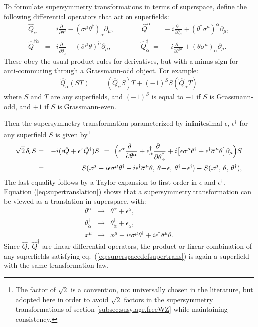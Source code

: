 \documentclass[12pt]{article}
\def\beq{\begin{eqnarray}}
\def\eeq{\end{eqnarray}}
\def\sigmabar{\overline\sigma}
\begin{document}
To formulate supersymmetry transformations in terms of superspace,
define the following differential operators that act on superfields:
\beq
\hat Q_\alpha &=& i \frac{\partial\phantom{x}}{\partial\theta^\alpha} 
- (\sigma^\mu \theta^\dagger)_\alpha \partial_\mu
,
\qquad\qquad
\hat Q^\alpha \>=\> -i\frac{\partial\phantom{x}}{\partial\theta_\alpha} 
+ (\theta^\dagger \sigmabar^\mu)^\alpha \partial_\mu
,
\label{eq:defQhat}
\\
\hat Q^{\dagger\dot\alpha} &=& 
i\frac{\partial\phantom{x}}{\partial\theta^\dagger_{\dot\alpha}} 
- (\sigmabar^\mu \theta)^{\dot\alpha} \partial_\mu
,
\qquad\qquad\>
\hat Q^{\dagger}_{\dot\alpha} \>=\> 
-i\frac{\partial\phantom{x}}{\partial\theta^{\dagger\dot\alpha}} 
+(\theta \sigma^\mu)_{\dot\alpha} \partial_\mu
.
\label{eq:defQdaggerhat}
\eeq
These obey the usual 
product rules for derivatives, but with a minus sign for anti-commuting through
a Grassmann-odd object. For example:
\beq
\hat Q_\alpha (S T) &=& (\hat Q_\alpha S) T + (-1)^S S (\hat Q_\alpha T)
\label{eq:grassmanproductrule}
\eeq
where $S$ and $T$ are any superfields, and $(-1)^S$ is equal to 
$-1$ if $S$ is Grassmann-odd, and $+1$ if $S$ is Grassmann-even.

Then the supersymmetry transformation parameterized by infinitesimal 
$\epsilon$, $\epsilon^\dagger$ for any superfield $S$ is given 
by\footnote{The factor of $\sqrt{2}$ is a convention, not universally 
chosen in the literature, but adopted here in order to avoid $\sqrt{2}$ 
factors in the supersymmetry transformations of section 
\ref{subsec:susylagr.freeWZ} while maintaining consistency.}
\beq
\sqrt{2}\, \delta_{\epsilon} S &=& 
-i
(\epsilon \hat Q + \epsilon^\dagger \hat Q^\dagger) S
\>\,=\>\,
\Bigl (\epsilon^\alpha \frac{\partial\phantom{x}}{\partial\theta^\alpha} 
    + \epsilon^\dagger_{\dot\alpha} 
\frac{\partial\phantom{x}}{\partial\theta^\dagger_{\dot\alpha}}
    + i \bigl [\epsilon \sigma^\mu \theta^\dagger 
       + \epsilon^\dagger \sigmabar^\mu \theta \bigr ] \partial_\mu \Bigr ) S
\label{eq:superspacedefsupertrans}
\\
&=&
S (x^\mu + i \epsilon \sigma^\mu \theta^\dagger 
+ i \epsilon^\dagger \sigmabar^\mu \theta 
, \> \theta\! +\! \epsilon
,\> \theta^\dagger\! +\! \epsilon^\dagger)
-  
S (x^\mu, \, \theta,\, \theta^\dagger)    ,
\label{eq:supertranslation}
\eeq
The last equality follows
by a Taylor expansion to first order in $\epsilon$ and $\epsilon^\dagger$.
Equation (\ref{eq:supertranslation}) shows that a supersymmetry 
transformation can be viewed as a translation in superspace, with:
\beq
\theta^\alpha &\rightarrow& \theta^\alpha + \epsilon^\alpha,
\\
\theta^\dagger_{\dot\alpha} &\rightarrow& \theta^\dagger_{\dot\alpha} 
+ \epsilon^\dagger_{\dot\alpha},
\\
x^\mu &\rightarrow& x^\mu + i \epsilon \sigma^\mu \theta^\dagger 
+ i \epsilon^\dagger \sigmabar^\mu \theta .
\eeq
Since $\hat Q$, $\hat Q^\dagger$ are linear differential operators, the product or 
linear combination of any superfields satisfying 
eq.~(\ref{eq:superspacedefsupertrans}) is again a superfield with the 
same transformation law.
\end{document}
